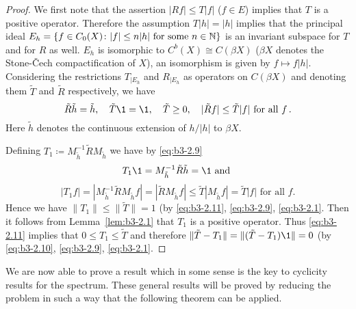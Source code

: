 \begin{proof}
	We first note that the assertion $|Rf| \leq T|f|$ ($f \in E$) implies that $T$ is a positive operator.
	Therefore the assumption $T|h| = |h|$ implies that the principal ideal $E_{h} = \{f \in C_{0}(X) \colon |f| \leq n|h| \text{ for some } n \in \mathbb{N}\}$ is an invariant subspace for $T$ and for $R$ as well.
	$E_{h}$ is isomorphic to $C^{b}(X) \cong C(\beta X)$ ($\beta X$ denotes the Stone-Čech compactification of $X$), an isomorphism is given by $f \mapsto f|h|$.
	Considering the restrictions $T_{|E_{h}}$ and $R_{|E_{h}}$ as operators on $C(\beta X)$ and denoting them $\tilde{T}$ and $\tilde{R}$ respectively, we have
\begin{equation}\label{eq:b3-2.9}
		\tilde{R}\tilde{h} = \tilde{h}, \quad \tilde{T}\1 = \1, \quad \tilde{T} \geq 0, \quad |\tilde{R}f| \leq \tilde{T}|f| \text{ for all } f\,.
	\end{equation}
	Here $\tilde{h}$ denotes the continuous extension of $h/|h|$ to $\beta X$.
	
	Defining $T_{1} \coloneqq M_{\tilde{h}}^{-1}\tilde{R}M_{\tilde{h}}$ we have by \eqref{eq:b3-2.9}
	\begin{equation}\label{eq:b3-2.10}
	T_{1}\1 = M_{\tilde{h}}^{-1}\tilde{R}\tilde{h} = \1 \text{ and }
	\end{equation}
	\begin{equation}\label{eq:b3-2.11}
	|T_{1}f| = |M_{\tilde{h}}^{-1}\tilde{R}M_{\tilde{h}}f| = |\tilde{R}M_{\tilde{h}}f| \leq \tilde{T}|M_{\tilde{h}}f| = \tilde{T}|f| \text{ for all } f.
	\end{equation}
	Hence we have $\|T_{1}\| \leq \|\tilde{T}\| = 1$ (by \eqref{eq:b3-2.11}, \eqref{eq:b3-2.9}, \eqref{eq:b3-2.1}.
	Then it follows from Lemma~\ref{lem:b3-2.1} that $T_{1}$ is a positive operator.
	Thus \eqref{eq:b3-2.11} implies that $0 \leq T_{1} \leq \tilde{T}$ and therefore $\|\tilde{T} - T_{1}\| = \|(\tilde{T} - T_{1})\1\| = 0$ (by \eqref{eq:b3-2.10}, \eqref{eq:b3-2.9}, \eqref{eq:b3-2.1}.
\end{proof}
We are now able to prove a result which in some sense is the key to cyclicity results for the spectrum.
	These general results will be proved by reducing the problem in such a way that the following theorem can be applied.

